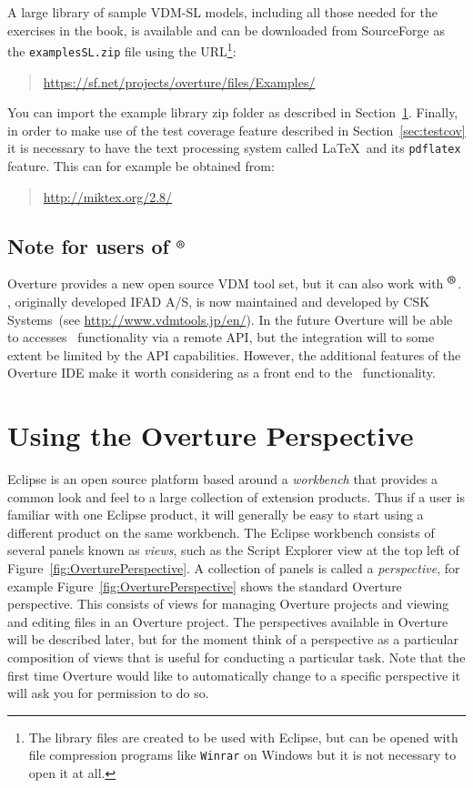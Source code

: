 A large library of sample VDM-SL models, including all those needed
for the exercises in the book, is available and can be downloaded from
SourceForge as the \texttt{examplesSL.zip} file using the
URL\footnote{The library files are created to be used with Eclipse,
  but can be opened with file compression programs like \texttt{Winrar} on
  Windows but it is not necessary to open it at all.}: 
\begin{quote}
\url{https://sf.net/projects/overture/files/Examples/}
\end{quote}
You can import the example library zip folder as described in
Section~\ref{sec:vdmsupport}.  Finally, in order to make use of the
test coverage feature described in Section~\ref{sec:testcov} it is
necessary to have the text processing system called \LaTeX\ and its
\texttt{pdflatex} feature. This can for example be obtained from:
\begin{quote}
\url{http://miktex.org/2.8/}
\end{quote}

\subsection*{Note for users of \vdmtools$^{\mbox{\small\textbf{{\textregistered}}}}$}
Overture provides a new open source VDM tool set, but it can
also work with
\vdmtools$^{\mbox{\small\textbf{{\textregistered}}}}$. \vdmtools, originally developed IFAD A/S, is now
maintained and developed by CSK Systems~(see
\url{http://www.vdmtools.jp/en/}). In the future Overture will be able
to accesses
\vdmtools\ functionality via a remote API, but the integration will to
some extent be limited by the API capabilities. However, the additional
features of the Overture IDE make it worth considering as a front end
to the \vdmtools\ functionality.

\section{Using the Overture Perspective}\label{sec:vdmsupport}

Eclipse is an open source platform based around a \emph{workbench}
that provides a common look and feel to a large collection of
extension products. Thus if a user is familiar with one Eclipse
product, it will generally be easy to start using a different product
on the same workbench. The Eclipse workbench consists of several
panels known as \emph{views}, such as the Script Explorer view at the
top left of Figure~\ref{fig:OverturePerspective}. A
collection of panels is called a \emph{perspective}, for example
Figure~\ref{fig:OverturePerspective} shows the standard
Overture perspective. This consists of views for managing Overture
projects and viewing and editing files in an Overture project. The perspectives
available in Overture will be described later, but for the moment
think of a perspective as a particular composition of views that is
useful for conducting a particular task. Note that the first time
Overture would like to automatically change to a specific perspective
it will ask you for permission to do so.

